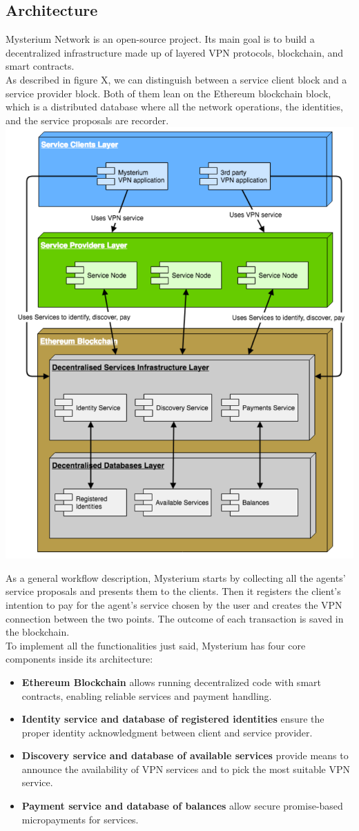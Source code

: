 \documentclass[]{article}
\begin{document}
	\subsection{Architecture}
	Mysterium Network is an open-source project. Its main goal is to build a decentralized infrastructure made up of layered VPN protocols, blockchain, and smart contracts.\\
	As described in figure X, we can distinguish between a service client block and a service provider block. Both of them lean on the Ethereum blockchain block, which is a distributed database where all the network operations, the identities, and the service proposals are recorder.\\

	\includegraphics[width=0.5\linewidth]{"images/mysterium_architecture.png"}
		
	As a general workflow description, Mysterium starts by collecting all the agents' service proposals and presents them to the clients. Then it registers the client's intention to pay for the agent's service chosen by the user and creates the VPN connection between the two points. The outcome of each transaction is saved in the blockchain.\\
	
	To implement all the functionalities just said, Mysterium has four core components inside its architecture:
	\begin{itemize}
		\item \textbf{Ethereum Blockchain} allows running decentralized code with smart contracts, enabling reliable services and payment handling.
		\item \textbf{Identity service and database of registered identities} ensure the proper identity acknowledgment between client and service provider.
		\item \textbf{Discovery service and database of available services} provide means to announce the availability of VPN services and to pick the most suitable VPN service.
		\item \textbf{Payment service and database of balances} allow secure promise-based micropayments for services.
	\end{itemize}
\end{document}
